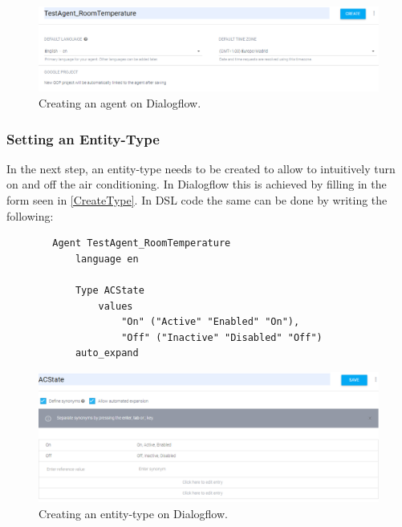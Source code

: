 \begin{figure}[ht]
    \centering
    \includegraphics[width=1\textwidth]{Thesis_Images/CreateAgent.PNG}
    \caption{Creating an agent on Dialogflow.}
        \label{CreateAgent}
\end{figure}

\subsubsection{Setting an Entity-Type}
In the next step, an entity-type needs to be created to allow to intuitively turn on and off the air conditioning.
In Dialogflow this is achieved by filling in the form seen in \autoref{CreateType}.
In DSL code the same can be done by writing the following:
\begin{samepage}    
    \begin{verbatim}
        Agent TestAgent_RoomTemperature
            language en 
        
            Type ACState
                values 
                    "On" ("Active" "Enabled" "On"),
                    "Off" ("Inactive" "Disabled" "Off")
            auto_expand
    \end{verbatim}
\end{samepage}

\begin{figure}[ht]
    \centering
    \includegraphics[width=1\textwidth]{Thesis_Images/CreateType.PNG}
    \caption{Creating an entity-type on Dialogflow.}
        \label{CreateType}
\end{figure}

